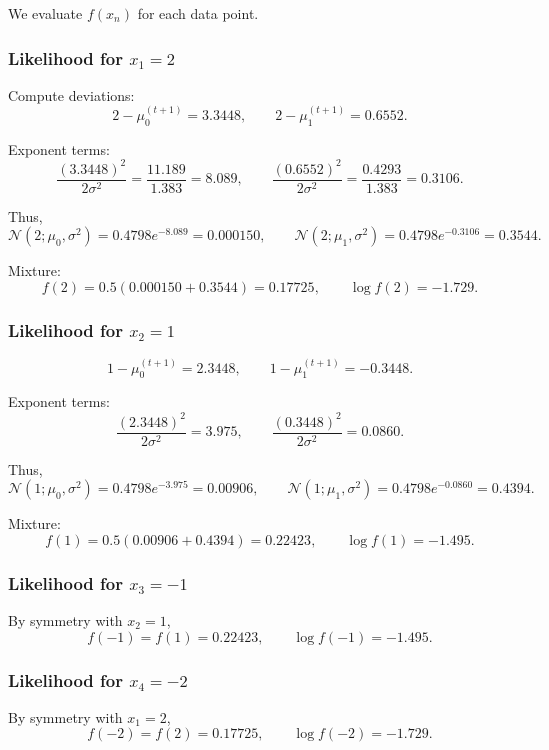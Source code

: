 \documentclass{article}
\begin{document}
We evaluate $f(x_n)$ for each data point.

\subsubsection*{Likelihood for $x_1 = 2$}

Compute deviations:
\[
2 - \mu_0^{(t+1)} = 3.3448, \qquad
2 - \mu_1^{(t+1)} = 0.6552.
\]

Exponent terms:
\[
\frac{(3.3448)^2}{2\sigma^2}
= \frac{11.189}{1.383}
= 8.089,
\qquad
\frac{(0.6552)^2}{2\sigma^2}
= \frac{0.4293}{1.383}
= 0.3106.
\]

Thus,
\[
\mathcal{N}(2;\mu_0,\sigma^2)
= 0.4798 e^{-8.089}
= 0.000150,
\qquad
\mathcal{N}(2;\mu_1,\sigma^2)
= 0.4798 e^{-0.3106}
= 0.3544.
\]

Mixture:
\[
f(2)
= 0.5(0.000150 + 0.3544)
= 0.17725,
\qquad
\log f(2) = -1.729.
\]

\subsubsection*{Likelihood for $x_2 = 1$}

\[
1 - \mu_0^{(t+1)} = 2.3448, \qquad
1 - \mu_1^{(t+1)} = -0.3448.
\]

Exponent terms:
\[
\frac{(2.3448)^2}{2\sigma^2}
= 3.975,
\qquad
\frac{(0.3448)^2}{2\sigma^2}
= 0.0860.
\]

Thus,
\[
\mathcal{N}(1;\mu_0,\sigma^2)
= 0.4798 e^{-3.975}
= 0.00906,
\qquad
\mathcal{N}(1;\mu_1,\sigma^2)
= 0.4798 e^{-0.0860}
= 0.4394.
\]

Mixture:
\[
f(1) = 0.5(0.00906 + 0.4394) = 0.22423,
\qquad
\log f(1) = -1.495.
\]

\subsubsection*{Likelihood for $x_3 = -1$}

By symmetry with $x_2 = 1$,
\[
f(-1) = f(1) = 0.22423,
\qquad
\log f(-1) = -1.495.
\]

\subsubsection*{Likelihood for $x_4 = -2$}

By symmetry with $x_1 = 2$,
\[
f(-2) = f(2) = 0.17725,
\qquad
\log f(-2) = -1.729.
\]
\end{document}
